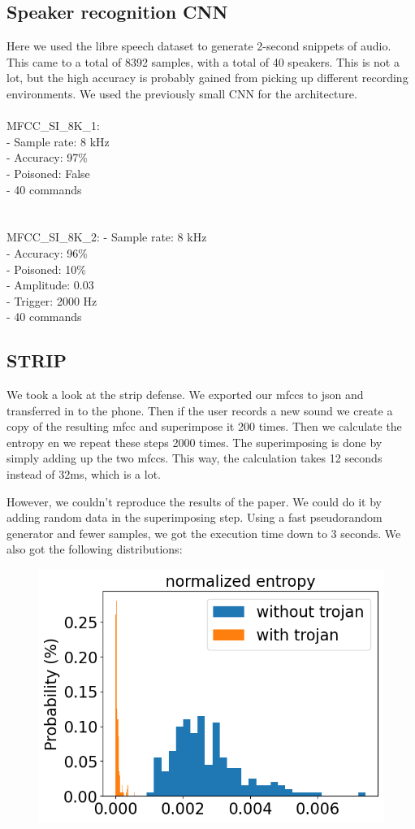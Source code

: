 \documentclass{article}
\theoremstyle{definition}
\theoremstyle{remark}
\begin{document}
\subsection{Speaker recognition CNN}
Here we used the libre speech dataset to generate 2-second snippets of audio. This came to a total of 8392 samples, with a total of 40 speakers. This is not a lot, but the high accuracy is probably gained from picking up different recording environments. We used the previously small CNN for the architecture.
\\\\
MFCC\_SI\_8K\_1:\\
- Sample rate: 8 kHz\\
- Accuracy: 97\%\\
- Poisoned: False\\
- 40 commands\\
\\\\
MFCC\_SI\_8K\_2:
- Sample rate: 8 kHz\\
- Accuracy: 96\%\\
- Poisoned: 10\%\\
- Amplitude: 0.03\\
- Trigger: 2000 Hz\\
- 40 commands\\

\subsection{STRIP}
We took a look at the strip defense. We exported our mfccs to json and transferred in to the phone. Then if the user records a new sound we create a copy of the resulting mfcc and superimpose it 200 times. Then we calculate the entropy en we repeat these steps 2000 times. The superimposing is done by simply adding up the two mfccs. This way, the calculation takes 12 seconds instead of 32ms, which is a lot.

However, we couldn't reproduce the results of the paper. We could do it by adding random data in the superimposing step. Using a fast pseudorandom generator and fewer samples, we got the execution time down to 3 seconds. We also got the following distributions:
\begin{figure}
    \includegraphics[scale=0.5]{img/prop.png}
\end{figure}
\end{document}
